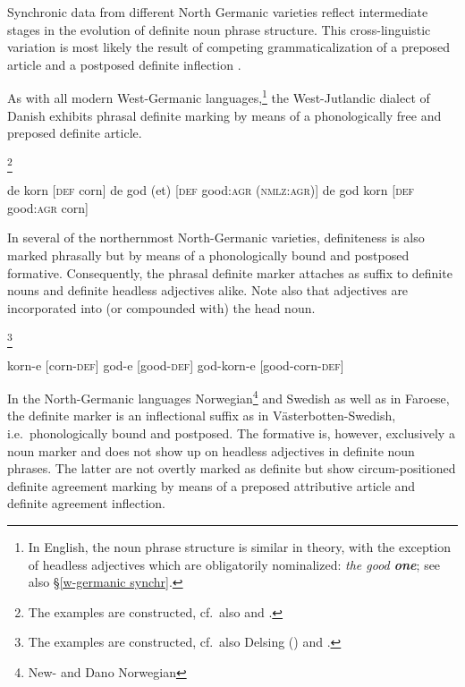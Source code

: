 {Synchronic data from different North Germanic varieties reflect intermediate stages in the evolution of definite noun phrase structure. This cross-linguistic variation is most likely the result of competing grammaticalization of a preposed article and a postposed definite inflection \citep{dahl2003}. 

As with all modern West-Germanic languages,\footnote{In English, the noun phrase structure is similar in theory, with the exception of headless adjectives which are obligatorily nominalized: \textit{the good \textbf{one}}; see also \S\ref{w-germanic synchr}.} the West-Jutlandic dialect of Danish exhibits phrasal definite marking by means of a phonologically free and preposed definite article.
\begin{exe}
\ex {}\footnote{The examples are constructed, cf.~also \citet[121–122]{delsing1993} and \citet{dahl2003}.}\\
\begin{xlist}
\ex de korn [\textsc{def} corn]
\ex de god (et) [\textsc{def} good:\textsc{agr} (\textsc{nmlz:agr})]
\ex de god korn [\textsc{def} good:\textsc{agr} corn]
\end{xlist}
\end{exe}
In several of the northernmost North-Germanic varieties, definiteness is also marked phrasally but by means of a phonologically bound and postposed formative. Consequently, the phrasal definite marker attaches as suffix to definite nouns and definite headless adjectives alike. Note also that adjectives are incorporated into (or compounded with) the head noun. 
\begin{exe}
\ex {}\footnote{The examples are constructed, cf.~also Delsing (\citeyear[122–123]{delsing1993}) and \cite{dahl2003}.}\\
\begin{xlist}
\ex korn-e [corn-\textsc{def}]
\ex god-e [good-\textsc{def}]
\ex god-korn-e [good-corn-\textsc{def}]
\end{xlist}
\end{exe}
In the North-Germanic languages Norwegian\footnote{New- and Dano Norwegian} and Swedish as well as in Faroese, the definite marker is an inflectional suffix as in Västerbotten-Swedish, i.e.~phonologically bound and postposed. The formative is, however, exclusively a noun marker and does not show up on headless adjectives in definite noun phrases. The latter are not overtly marked as definite but show circum-positioned definite agreement marking by means of a preposed attributive article and definite agreement inflection.
}
